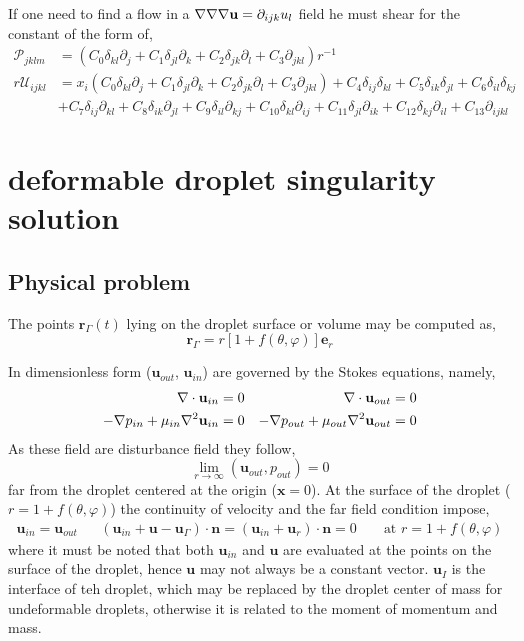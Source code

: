 If one need to find a flow in a $\mathbf{\nabla}\mathbf{\nabla}\mathbf{\nabla} \textbf{u} = \partial_{ijk}u_l$ field he must shear for the constant of the form of, 
\begin{align}
    \mathcal{P}_{jklm}
    &=
    (C_0 \delta_{kl}\partial_j
    + C_1 \delta_{jl}\partial_k
    + C_2 \delta_{jk}\partial_l
    + C_3 \partial_{jkl}
    )r^{-1}\\
    r \mathcal{U}_{ijkl}
    &=
    x_i 
    (C_0 \delta_{kl}\partial_j
    + C_1 \delta_{jl}\partial_k
    + C_2 \delta_{jk}\partial_l
    + C_3 \partial_{jkl})
    + C_4\delta_{ij}\delta_{kl}
    + C_5\delta_{ik}\delta_{jl}
    + C_6\delta_{il}\delta_{kj}\\
    &
    + C_7\delta_{ij}\partial_{kl}
    + C_8\delta_{ik}\partial_{jl}
    + C_9\delta_{il}\partial_{kj}
    + C_{10}\delta_{kl}\partial_{ij}
    + C_{11}\delta_{jl}\partial_{ik}
    + C_{12}\delta_{kj}\partial_{il}
    + C_{13}\partial_{ijkl}
\end{align}

\section{deformable droplet singularity solution}
\subsection{Physical problem}
The points $\textbf{r}_\Gamma(t)$ lying on the droplet surface or volume may be computed as,
\begin{equation}
    \textbf{r}_\Gamma = r [1 + f(\theta,\varphi)]\textbf{e}_r
\end{equation}


In dimensionless form ($\textbf{u}_{out}$, $\textbf{u}_{in}$) are governed by the Stokes equations, namely, 
\begin{align}
    \mathbf{\nabla}\cdot \textbf{u}_{in} = 0 
    && \mathbf{\nabla}\cdot \textbf{u}_{out} = 0 \\
    -\mathbf{\nabla} p_{in} + \mu_{in}\mathbf{\nabla}^2 \textbf{u}_{in}  = 0 
    &&-\mathbf{\nabla} p_{out} + \mu_{out}\mathbf{\nabla}^2 \textbf{u}_{out}  = 0 
\end{align}
As these field are disturbance field they follow,
\begin{equation}
    \lim_{r\to \infty}(\textbf{u}_{out},p_{out}) = 0 
\end{equation}
far from the droplet centered at the origin ($\textbf{x} = 0$). 
At the surface of the droplet ($r = 1 + f(\theta,\varphi)$) the continuity of velocity and the far field condition impose, 
\begin{align}
    \textbf{u}_{in} = \textbf{u}_{out}
    && 
    (\textbf{u}_{in}  + \textbf{u} - \textbf{u}_\Gamma)\cdot \textbf{n}
    = (\textbf{u}_{in}  + \textbf{u}_r)\cdot \textbf{n}
    = 0
    &&
    \text{ at }
    r = 1 + f(\theta,\varphi)
\end{align}
where it must be noted that both $\textbf{u}_{in}$ and $\textbf{u}$ are evaluated at the points on the surface of the droplet, hence $\textbf{u}$ may not always be a constant vector. 
$\textbf{u}_I$ is the interface of teh droplet, which may be replaced by the droplet center of mass for undeformable droplets, otherwise it is related to the moment of momentum and mass. 


